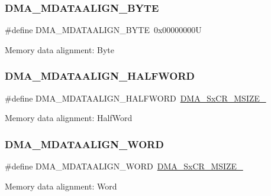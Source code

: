 \subsubsection{\texorpdfstring{DMA\_MDATAALIGN\_BYTE}{DMA\_MDATAALIGN\_BYTE}}
{\footnotesize\ttfamily \#define D\+M\+A\+\_\+\+M\+D\+A\+T\+A\+A\+L\+I\+G\+N\+\_\+\+B\+Y\+TE~0x00000000U}

Memory data alignment\+: Byte \mbox{\label{group___d_m_a___memory__data__size_ga2c7355971c0da34a7ffe50ec87403071}} 
\subsubsection{\texorpdfstring{DMA\_MDATAALIGN\_HALFWORD}{DMA\_MDATAALIGN\_HALFWORD}}
{\footnotesize\ttfamily \#define D\+M\+A\+\_\+\+M\+D\+A\+T\+A\+A\+L\+I\+G\+N\+\_\+\+H\+A\+L\+F\+W\+O\+RD~\mbox{\hyperlink{group___peripheral___registers___bits___definition_ga39adb60b3394b61366691b45b8c2b80f}{D\+M\+A\+\_\+\+Sx\+C\+R\+\_\+\+M\+S\+I\+Z\+E\+\_}}}

Memory data alignment\+: Half\+Word \mbox{\label{group___d_m_a___memory__data__size_ga8812da819f18c873249074f3920220b2}} 
\subsubsection{\texorpdfstring{DMA\_MDATAALIGN\_WORD}{DMA\_MDATAALIGN\_WORD}}
{\footnotesize\ttfamily \#define D\+M\+A\+\_\+\+M\+D\+A\+T\+A\+A\+L\+I\+G\+N\+\_\+\+W\+O\+RD~\mbox{\hyperlink{group___peripheral___registers___bits___definition_gaa5c2ef08ab52de52b4e1fd785f60e263}{D\+M\+A\+\_\+\+Sx\+C\+R\+\_\+\+M\+S\+I\+Z\+E\+\_}}}

Memory data alignment\+: Word 